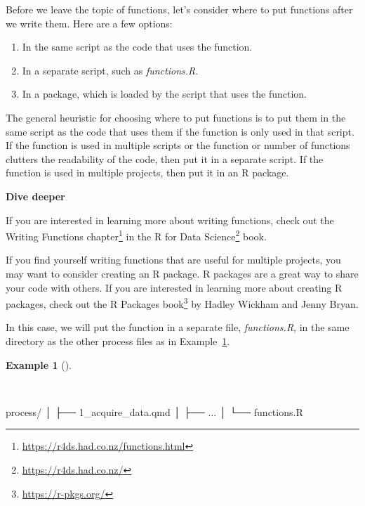 \documentclass[
  letterpaper,
]{latex/krantz}
\newenvironment{Shaded}{\begin{snugshade}}{\end{snugshade}}
\newcommand{\ExtensionTok}[1]{\textcolor[rgb]{0.00,0.00,0.00}{#1}}
\newcommand{\NormalTok}[1]{\textcolor[rgb]{0.00,0.00,0.00}{#1}}
\providecommand{\tightlist}{%
  \setlength{\itemsep}{0pt}\setlength{\parskip}{0pt}}\usepackage{longtable,booktabs,array}
\theoremstyle{definition}
\newtheorem{example}{Example}[chapter]
\theoremstyle{remark}
\DeclareRobustCommand{\href}[2]{#2\footnote{\url{#1}}}
\begin{document}
Before we leave the topic of functions, let's consider where to put
functions after we write them. Here are a few options:

\begin{enumerate}
\def\labelenumi{\arabic{enumi}.}
\tightlist
\item
  In the same script as the code that uses the function.
\item
  In a separate script, such as \emph{functions.R}.
\item
  In a package, which is loaded by the script that uses the function.
\end{enumerate}

The general heuristic for choosing where to put functions is to put them
in the same script as the code that uses them if the function is only
used in that script. If the function is used in multiple scripts or the
function or number of functions clutters the readability of the code,
then put it in a separate script. If the function is used in multiple
projects, then put it in an R package.

\begin{tcolorbox}[enhanced jigsaw, toprule=.15mm, breakable, colback=white, opacityback=0, leftrule=.75mm, bottomrule=.15mm, colframe=quarto-callout-color-frame, left=2mm, arc=.35mm, rightrule=.15mm]

\textbf{ Dive deeper}

If you are interested in learning more about writing functions, check
out the \href{https://r4ds.had.co.nz/functions.html}{Writing Functions
chapter} in the \href{https://r4ds.had.co.nz/}{R for Data Science} book.

If you find yourself writing functions that are useful for multiple
projects, you may want to consider creating an R package. R packages are
a great way to share your code with others. If you are interested in
learning more about creating R packages, check out the
\href{https://r-pkgs.org/}{R Packages book} by Hadley Wickham and Jenny
Bryan.

\end{tcolorbox}

In this case, we will put the function in a separate file,
\emph{functions.R}, in the same directory as the other process files as
in Example~\ref{exm-ad-functions-r}.

\begin{example}[]\protect\hypertarget{exm-ad-functions-r}{}\label{exm-ad-functions-r}

~

\begin{Shaded}
\begin{Highlighting}[]
\ExtensionTok{process/}
  \ExtensionTok{│}\NormalTok{   ├── 1\_acquire\_data.qmd}
  \ExtensionTok{│}\NormalTok{   ├── ...}
  \ExtensionTok{│}\NormalTok{   └── functions.R}
\end{Highlighting}
\end{Shaded}

\end{example}
\end{document}
